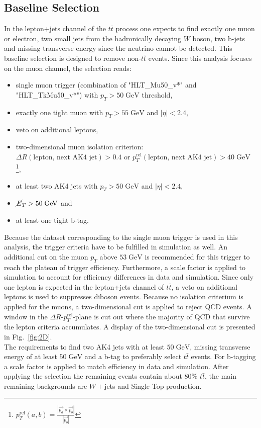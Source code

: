 \subsection{Baseline Selection}
\label{sec:PreSel}
	In the lepton+jets channel of the $t\bar{t}$ process one expects to find exactly one muon or electron, two small jets from the hadronically decaying $W$ boson, two b-jets and missing transverse energy since the neutrino cannot be detected. This baseline selection is designed to remove non-$t\bar{t}$ events. Since this analysis focuses on the muon channel, the selection reads:
	\begin{itemize}
	\item single muon trigger (combination of "HLT\_Mu50\_v*" and "HLT\_TkMu50\_v*") with $p_T > 50\;\text{GeV}$ threshold,
	\item exactly one tight muon with $p_T > 55\;\text{GeV}$ and $|\eta| < 2.4$,
	\item veto on additional leptons,
	\item two-dimensional muon isolation criterion: \\ $\Delta R(\text{lepton, next AK4 jet}) > 0.4$ or $p_T^{\text{rel}}(\text{lepton, next AK4 jet}) > 40\;\text{GeV}$ \footnote{$p_T^{\text{rel}}(a,b) = \frac{|\vec{p_a} \times \vec{p_b}|}{|\vec{p_b}|}$},
	\item at least two AK4 jets with $p_T > 50\;\text{GeV}$ and $|\eta| < 2.4$,
	\item $\cancel{E}_T > 50\;\text{GeV}$ and
	\item at least one tight b-tag.
	\end{itemize}
	Because the dataset corresponding to the single muon trigger is used in this analysis, the trigger criteria have to be fulfilled in simulation as well. An additional cut on the muon $p_T$ above $53\;\text{GeV}$ is recommended \cite{MuonID} for this trigger to reach the plateau of trigger efficiency. Furthermore, a scale factor is applied to simulation to account for efficiency differences in data and simulation. Since only one lepton is expected in the lepton+jets channel of $t\bar{t}$, a veto on additional leptons is used to suppresses diboson events. Because no isolation criterium is applied for the muons, a two-dimensional cut is applied to reject QCD events. A window in the $\Delta R$-$p_T^{\text{rel}}$-plane is cut out where the majority of QCD that survive the lepton criteria accumulates. A display of the two-dimensional cut is presented in Fig.~\ref{fig:2D}. \\
	The requirements to find two AK4 jets with at least $50\;\text{GeV}$, missing transverse energy of at least $50\;\text{GeV}$ and a b-tag to preferably select $t\bar{t}$ events. For b-tagging a scale factor is applied to match efficiency in data and simulation. After applying the selection the remaining events contain about $80\%$ $t\bar{t}$, the main remaining backgrounds are $W+$jets and Single-Top production. 
